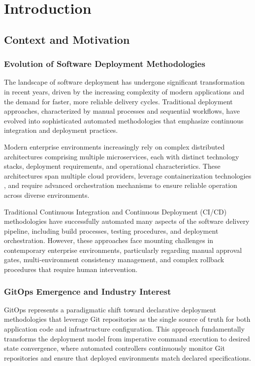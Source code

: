 \chapter{Introduction}

\section{Context and Motivation}

\subsection{Evolution of Software Deployment Methodologies}
The landscape of software deployment has undergone significant transformation in recent years, driven by the increasing complexity of modern applications and the demand for faster, more reliable delivery cycles. Traditional deployment approaches, characterized by manual processes and sequential workflows, have evolved into sophisticated automated methodologies that emphasize continuous integration and deployment practices.

Modern enterprise environments increasingly rely on complex distributed architectures comprising multiple microservices, each with distinct technology stacks, deployment requirements, and operational characteristics. These architectures span multiple cloud providers, leverage containerization technologies \cite{docker2023}, and require advanced orchestration mechanisms \cite{kubernetes2023} to ensure reliable operation across diverse environments.

Traditional Continuous Integration and Continuous Deployment (CI/CD) methodologies have successfully automated many aspects of the software delivery pipeline, including build processes, testing procedures, and deployment orchestration. However, these approaches face mounting challenges in contemporary enterprise environments, particularly regarding manual approval gates, multi-environment consistency management, and complex rollback procedures that require human intervention.

\subsection{GitOps Emergence and Industry Interest}
GitOps represents a paradigmatic shift toward declarative deployment methodologies that leverage Git repositories as the single source of truth for both application code and infrastructure configuration. This approach fundamentally transforms the deployment model from imperative command execution to desired state convergence, where automated controllers continuously monitor Git repositories and ensure that deployed environments match declared specifications.

